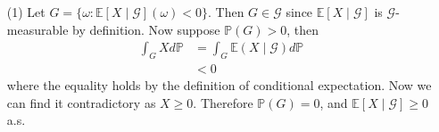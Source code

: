 \begin{enumerate}
    \item[(1)] Let $G = \{\omega: \mathbb{E}[X \mid \mathcal{G}](\omega) < 0 \}$.
    Then $G \in \mathcal{G}$ since $\mathbb{E}[X \mid \mathcal{G}]$ is $\mathcal{G}$-measurable by definition.
    Now suppose $\mathbb{P}(G) > 0$, then
    \begin{equation}
        \begin{split}
            \int_{G} X d \mathbb{P}
            &= \int_{G} \mathbb{E}(X \mid \mathcal{G}) d \mathbb{P} \\
            &< 0
        \end{split}
    \end{equation}
    where the equality holds by the definition of conditional expectation.
    Now we can find it contradictory as $X \geq 0$.
    Therefore $\mathbb{P}(G) = 0$, and $\mathbb{E}[X \mid \mathcal{G}] \geq 0$ a.s.


\end{enumerate}
